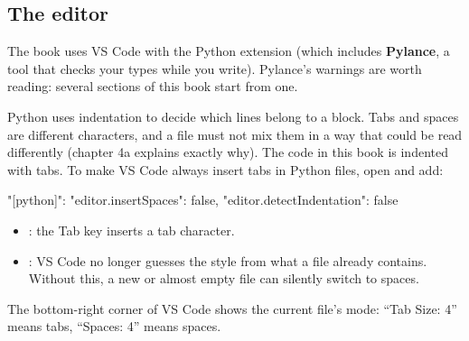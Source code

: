 \subsection{The editor}

The book uses VS Code with the Python extension (which includes \textbf{Pylance}, a tool that checks your types while you write). Pylance's warnings are worth reading: several sections of this book start from one.

Python uses indentation to decide which lines belong to a block. Tabs and spaces are different characters, and a file must not mix them in a way that could be read differently (chapter 4a explains exactly why). The code in this book is indented with tabs. To make VS Code always insert tabs in Python files, open  and add:

\begin{code}
{
    "[python]": {
        "editor.insertSpaces": false,
        "editor.detectIndentation": false
    }
}
\end{code}

\begin{itemize}
\item {}: the Tab key inserts a tab character.
\item {}: VS Code no longer guesses the style from what a file already contains. Without this, a new or almost empty file can silently switch to spaces.
\end{itemize}

The bottom-right corner of VS Code shows the current file's mode: ``Tab Size: 4'' means tabs, ``Spaces: 4'' means spaces.
